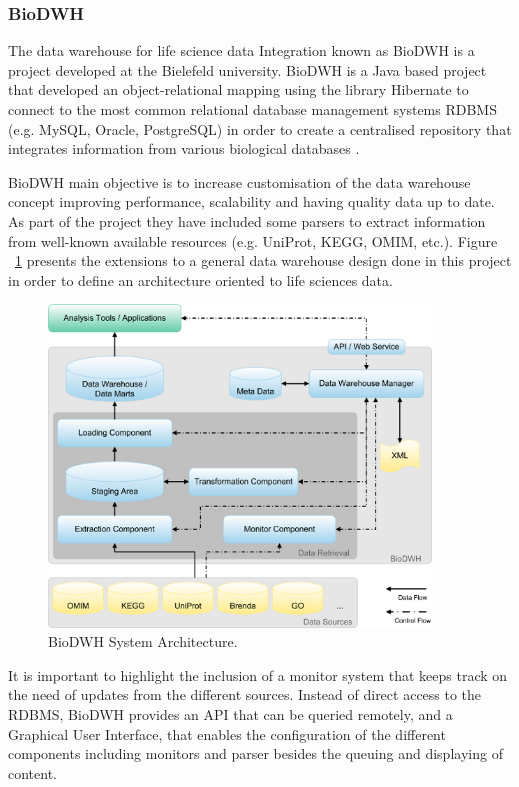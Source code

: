 \subsubsection{BioDWH}
The data warehouse for life science data Integration known as BioDWH is a project developed at  the Bielefeld university. BioDWH is a Java based project that developed an object-relational mapping using the library Hibernate to connect to the most common relational database management systems RDBMS (e.g. MySQL, Oracle, PostgreSQL) in order to create a centralised repository that integrates information from various biological databases \cite{TOP2008}.

BioDWH main objective is to increase customisation of the data warehouse concept improving performance, scalability and having quality data up to date. As part of the project they have included some parsers to extract information from well-known available resources (e.g. UniProt, KEGG, OMIM, etc.). Figure ~\ref{fig:biodwh} presents the extensions to a general data warehouse design done in this project in order to define an architecture oriented to life sciences data.

\begin{figure}  
\centering
\includegraphics[width=4in]{figures/dwh_architecture.png}
\caption[BioDWH System Architecture.]{BioDWH System Architecture.
\label{fig:biodwh}}
\end{figure}

It is important to highlight the inclusion of a monitor system that keeps track on the need of updates from the different sources. Instead of direct access to the RDBMS, BioDWH provides an API that can be queried remotely, and a Graphical User Interface, that enables the configuration of the different components including monitors and parser besides the queuing and displaying of content.


